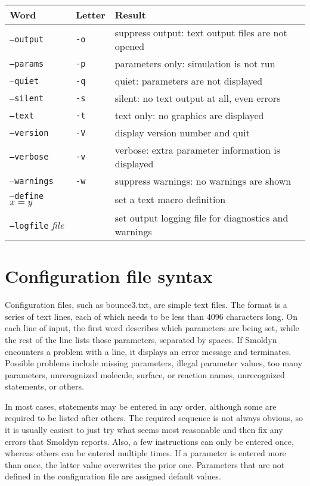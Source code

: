 \documentclass {scrbook}
\newcommand {\ttt} {\texttt}
\begin{document}
\begin{longtable}[c]{lll}
Word & Letter & Result\\
\hline
\ttt{--output} & \ttt{-o} & suppress output: text output files are not opened\\
\ttt{--params} & \ttt{-p} & parameters only: simulation is not run\\
\ttt{--quiet} & \ttt{-q} & quiet: parameters are not displayed\\
\ttt{--silent} & \ttt{-s} & silent: no text output at all, even errors\\
\ttt{--text} & \ttt{-t} & text only: no graphics are displayed\\
\ttt{--version} & \ttt{-V} & display version number and quit\\
\ttt{--verbose} & \ttt{-v} & verbose: extra parameter information is displayed\\
\ttt{--warnings} & \ttt{-w} & suppress warnings: no warnings are shown\\
\ttt{--define} $x=y$ &  & set a text macro definition\\
\ttt{--logfile} \textit{file} & & set output logging file for diagnostics and warnings
\end{longtable}

\section{Configuration file syntax}

Configuration files, such as bounce3.txt, are simple text files. The format is a series of text lines, each of which needs to be less than 4096 characters long. On each line of input, the first word describes which parameters are being set, while the rest of the line lists those parameters, separated by spaces. If Smoldyn encounters a problem with a line, it displays an error message and terminates. Possible problems include missing parameters, illegal parameter values, too many parameters, unrecognized molecule, surface, or reaction names, unrecognized statements, or others.

In most cases, statements may be entered in any order, although some are required to be listed after others. The required sequence is not always obvious, so it is usually easiest to just try what seems most reasonable and then fix any errors that Smoldyn reports. Also, a few instructions can only be entered once, whereas others can be entered multiple times. If a parameter is entered more than once, the latter value overwrites the prior one. Parameters that are not defined in the configuration file are assigned default values.
\end{document}

